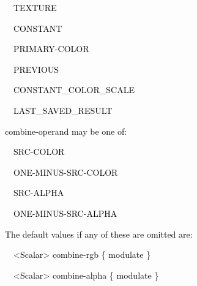 \documentclass[a4paper]{article}
\newcommand\textstyleOOoComputerKeyWord[1]{\textrm{\textcolor[rgb]{0.0,0.0,0.5019608}{#1}}}
\newcommand\textstyleOOoAssemblerSpecialChar[1]{\textrm{\textcolor[rgb]{0.0,0.5019608,0.0}{#1}}}
\newcommand\textstyleOOoAssemblerIdent[1]{\textrm{\textcolor{black}{#1}}}
\begin{document}
{\color{black}
\textstyleOOoComputerKeyWord{\textcolor{black}{\ \ \ \ \ \ TEXTURE}}}

{\color{black}
\textstyleOOoComputerKeyWord{\textcolor{black}{\ \ \ \ \ \ CONSTANT}}}

{\color{black}
\textstyleOOoComputerKeyWord{\textcolor{black}{\ \ \ \ \ \ PRIMARY-COLOR}}}

{\color{black}
\textstyleOOoComputerKeyWord{\textcolor{black}{\ \ \ \ \ \ PREVIOUS}}}

{\color{black}
\textstyleOOoComputerKeyWord{\textcolor{black}{\ \ \ \ \ \ CONSTANT\_COLOR\_SCALE}}}

{\color{black}
\textstyleOOoComputerKeyWord{\textcolor{black}{\ \ \ \ \ \ LAST\_SAVED\_RESULT}}}


\bigskip

{\color{black}
\textstyleOOoComputerKeyWord{\textcolor{black}{\ \ \ \ combine-operand may be one of:}}}


\bigskip

{\color{black}
\textstyleOOoComputerKeyWord{\textcolor{black}{\ \ \ \ \ \ SRC-COLOR}}}

{\color{black}
\textstyleOOoComputerKeyWord{\textcolor{black}{\ \ \ \ \ \ ONE-MINUS-SRC-COLOR}}}

{\color{black}
\textstyleOOoComputerKeyWord{\textcolor{black}{\ \ \ \ \ \ SRC-ALPHA}}}

{\color{black}
\textstyleOOoComputerKeyWord{\textcolor{black}{\ \ \ \ \ \ ONE-MINUS-SRC-ALPHA}}}


\bigskip

{\color{black}
\textstyleOOoComputerKeyWord{\textcolor{black}{\ \ \ \ The default values if any of these are omitted are:}}}

{\color{black}
\textstyleOOoComputerKeyWord{\textcolor{black}{\ \ \ \ \ \ }}\textstyleOOoAssemblerSpecialChar{{\textless}}\textstyleOOoAssemblerIdent{Scalar}\textstyleOOoAssemblerSpecialChar{{\textgreater}}\textstyleOOoComputerKeyWord{\textcolor{black}{
}}\textstyleOOoAssemblerIdent{combine}\textstyleOOoAssemblerSpecialChar{{}-}\textstyleOOoAssemblerIdent{rgb}\textstyleOOoComputerKeyWord{\textcolor{black}{
}}\textstyleOOoAssemblerSpecialChar{\{}\textstyleOOoComputerKeyWord{\textcolor{black}{
}}\textstyleOOoAssemblerIdent{modulate}\textstyleOOoComputerKeyWord{\textcolor{black}{
}}\textstyleOOoAssemblerSpecialChar{\}}}

{\color{black}
\textstyleOOoComputerKeyWord{\textcolor{black}{\ \ \ \ \ \ }}\textstyleOOoAssemblerSpecialChar{{\textless}}\textstyleOOoAssemblerIdent{Scalar}\textstyleOOoAssemblerSpecialChar{{\textgreater}}\textstyleOOoComputerKeyWord{\textcolor{black}{
}}\textstyleOOoAssemblerIdent{combine}\textstyleOOoAssemblerSpecialChar{{}-}\textstyleOOoAssemblerIdent{alpha}\textstyleOOoComputerKeyWord{\textcolor{black}{
}}\textstyleOOoAssemblerSpecialChar{\{}\textstyleOOoComputerKeyWord{\textcolor{black}{
}}\textstyleOOoAssemblerIdent{modulate}\textstyleOOoComputerKeyWord{\textcolor{black}{
}}\textstyleOOoAssemblerSpecialChar{\}}}
\end{document}
